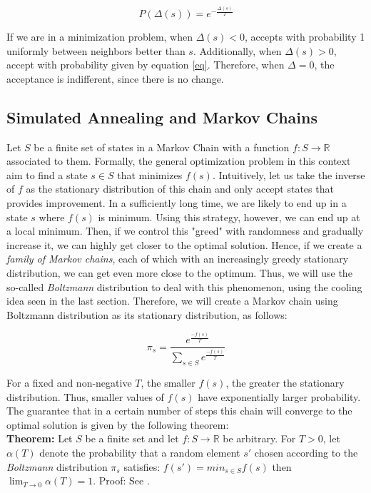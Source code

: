 \documentclass[12pt]{article}
\begin{document}
\begin{equation}
    P(\Delta(s)) = e^{-\frac{\Delta(s)}{T}}
    \label{eq}
\end{equation}

If we are in a minimization problem, when $\Delta(s) < 0$, accepts with probability 1 uniformly between neighbors better than $s$. Additionally, when $\Delta(s) > 0$, accept with probability given by equation \ref{eq}. Therefore, when $\Delta = 0$, the acceptance is indifferent, since there is no change.


\subsection{Simulated Annealing and Markov Chains}

Let $S$ be a finite set of states in a Markov Chain with a function $f: S \rightarrow \mathds{R}$ associated to them. Formally, the general optimization problem in this context aim to find a state $s \in S$ that minimizes $f(s)$. Intuitively, let us take the inverse of $f$ as the stationary distribution of this chain and only accept states that provides improvement. In a sufficiently long time, we are likely to end up in a state $s$ where $f(s)$ is minimum. Using this strategy, however, we can end up at a local minimum. Then, if we control this "greed" with randomness and gradually increase it, we can highly get closer to the optimal solution. Hence, if we create a \textit{family of Markov chains}, each of which with an increasingly greedy stationary distribution, we can get even more close to the optimum. Thus, we will use the so-called \emph{Boltzmann} distribution to deal with this phenomenon, using the cooling idea seen in the last section. Therefore, we will create a Markov chain using Boltzmann distribution as its stationary distribution, as follows:

$$\pi_s = \frac{e^{\frac{-f(s)}{T}}}{\sum_{s \in S}e^{\frac{-f(s)}{T}}}$$

For a fixed and non-negative $T$, the smaller $f(s)$, the greater the stationary distribution. Thus, smaller values of $f(s)$ have exponentially larger probability. 
The guarantee that in a certain number of steps this chain will converge to the optimal solution is given by the following theorem:\\

\noindent\textbf{Theorem:} Let $S$ be a finite set and let $f: S \rightarrow \mathds{R}$ be arbitrary. For $T>0$, let $\alpha(T)$ denote the probability that a random element $s'$ chosen according to the \emph{Boltzmann} distribution $\pi_s$ satisfies: $f(s') = \displaystyle min_{s\in S} f(s)$ then $\displaystyle \lim_{T \rightarrow 0} \alpha(T) = 1$. Proof: See \cite{Olle2002}.
\end{document}
